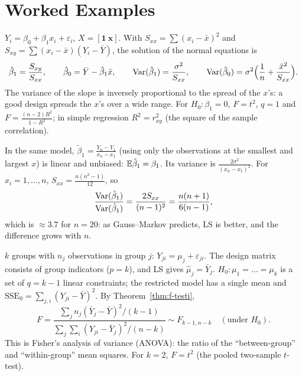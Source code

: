 \documentclass[main.tex]{subfiles}
\begin{document}
\section{Worked Examples}

\begin{example}\label{ex:basit-regresyon}
$Y_i=\beta_0+\beta_1x_i+\varepsilon_i$, $X=[\mathbf 1\ \mathbf x]$. With $S_{xx}=\sum(x_i-\bar x)^2$ and $S_{xy}=\sum(x_i-\bar x)(Y_i-\bar Y)$, the solution of the normal equations is
\[
\hat\beta_1=\frac{S_{xy}}{S_{xx}},\qquad\hat\beta_0=\bar Y-\hat\beta_1\bar x,\qquad\operatorname{Var}(\hat\beta_1)=\frac{\sigma^2}{S_{xx}},\qquad\operatorname{Var}(\hat\beta_0)=\sigma^2\Big(\frac1n+\frac{\bar x^2}{S_{xx}}\Big).
\]
The variance of the slope is inversely proportional to the spread of the $x$'s: a good design spreads the $x$'s over a wide range. For $H_0:\beta_1=0$, $F=t^2$, $q=1$ and $F=\frac{(n-2)R^2}{1-R^2}$; in simple regression $R^2=r_{xy}^2$ (the square of the sample correlation).
\end{example}

\begin{example}\label{ex:uc-nokta}
In the same model, $\tilde\beta_1=\frac{Y_n-Y_1}{x_n-x_1}$ (using only the observations at the smallest and largest $x$) is linear and unbiased: $\mathbb{E}\tilde\beta_1=\beta_1$. Its variance is $\frac{2\sigma^2}{(x_n-x_1)^2}$. For $x_i=1,\dots,n$, $S_{xx}=\frac{n(n^2-1)}{12}$, so
\[
\frac{\operatorname{Var}(\tilde\beta_1)}{\operatorname{Var}(\hat\beta_1)}=\frac{2S_{xx}}{(n-1)^2}=\frac{n(n+1)}{6(n-1)},
\]
which is $\approx3.7$ for $n=20$: as Gauss--Markov predicts, LS is better, and the difference grows with $n$.
\end{example}

\begin{example}\label{ex:anova}
$k$ groups with $n_j$ observations in group $j$: $Y_{ji}=\mu_j+\varepsilon_{ji}$. The design matrix consists of group indicators ($p=k$), and LS gives $\hat\mu_j=\bar Y_j$. $H_0:\mu_1=\dots=\mu_k$ is a set of $q=k-1$ linear constraints; the restricted model has a single mean and $\mathrm{SSE}_0=\sum_{j,i}(Y_{ji}-\bar Y)^2$. By Theorem~\ref{thm:f-testi},
\[
F=\frac{\sum_jn_j(\bar Y_j-\bar Y)^2/(k-1)}{\sum_j\sum_i(Y_{ji}-\bar Y_j)^2/(n-k)}\sim F_{k-1,n-k}\quad(\text{under }H_0).
\]
This is Fisher's analysis of variance (ANOVA): the ratio of the ``between-group'' and ``within-group'' mean squares. For $k=2$, $F=t^2$ (the pooled two-sample $t$-test).
\end{example}
\end{document}
